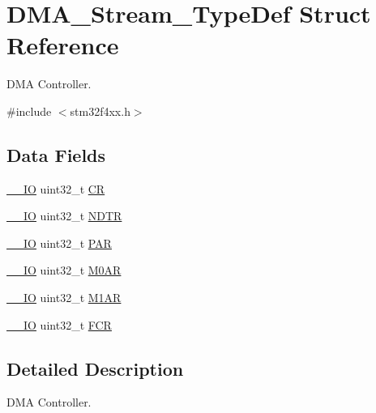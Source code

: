 \hypertarget{struct_d_m_a___stream___type_def}{}\section{D\+M\+A\+\_\+\+Stream\+\_\+\+Type\+Def Struct Reference}
\label{struct_d_m_a___stream___type_def}


D\+MA Controller.  




{\ttfamily \#include $<$stm32f4xx.\+h$>$}

\subsection*{Data Fields}
\begin{DoxyCompactItemize}
\item 
\hyperlink{group___c_m_s_i_s__core__definitions_gaec43007d9998a0a0e01faede4133d6be}{\+\_\+\+\_\+\+IO} uint32\+\_\+t \hyperlink{struct_d_m_a___stream___type_def_ab40c89c59391aaa9d9a8ec011dd0907a}{CR}
\item 
\hyperlink{group___c_m_s_i_s__core__definitions_gaec43007d9998a0a0e01faede4133d6be}{\+\_\+\+\_\+\+IO} uint32\+\_\+t \hyperlink{struct_d_m_a___stream___type_def_af60258ad5a25addc1e8969665d0c1731}{N\+D\+TR}
\item 
\hyperlink{group___c_m_s_i_s__core__definitions_gaec43007d9998a0a0e01faede4133d6be}{\+\_\+\+\_\+\+IO} uint32\+\_\+t \hyperlink{struct_d_m_a___stream___type_def_aef55be3d948c22dd32a97e8d4f8761fd}{P\+AR}
\item 
\hyperlink{group___c_m_s_i_s__core__definitions_gaec43007d9998a0a0e01faede4133d6be}{\+\_\+\+\_\+\+IO} uint32\+\_\+t \hyperlink{struct_d_m_a___stream___type_def_a63b4d166f4ab5024db6b493a7ab7b640}{M0\+AR}
\item 
\hyperlink{group___c_m_s_i_s__core__definitions_gaec43007d9998a0a0e01faede4133d6be}{\+\_\+\+\_\+\+IO} uint32\+\_\+t \hyperlink{struct_d_m_a___stream___type_def_aee7782244ceb4791d9a3891804ac47ac}{M1\+AR}
\item 
\hyperlink{group___c_m_s_i_s__core__definitions_gaec43007d9998a0a0e01faede4133d6be}{\+\_\+\+\_\+\+IO} uint32\+\_\+t \hyperlink{struct_d_m_a___stream___type_def_a5d5cc7f32884945503dd29f8f6cbb415}{F\+CR}
\end{DoxyCompactItemize}


\subsection{Detailed Description}
D\+MA Controller. 

